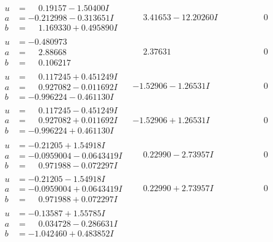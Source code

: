 \documentclass[1p]{elsarticle_modified}
\theoremstyle{definition}
\begin{document}
$$\begin{array}{c|c|c}
\begin{aligned}
u &= \phantom{-}0.19157 - 1.50400 I \\
a &= -0.212998 - 0.313651 I \\
b &= \phantom{-}1.169330 + 0.495890 I\end{aligned}
 & \phantom{-}3.41653 - 12.20260 I & \phantom{-0.000000 } 0 \\ \hline\begin{aligned}
u &= -0.480973\phantom{ +0.000000I} \\
a &= \phantom{-}2.88668\phantom{ +0.000000I} \\
b &= \phantom{-}0.106217\phantom{ +0.000000I}\end{aligned}
 & \phantom{-}2.37631\phantom{ +0.000000I} & \phantom{-0.000000 } 0 \\ \hline\begin{aligned}
u &= \phantom{-}0.117245 + 0.451249 I \\
a &= \phantom{-}0.927082 - 0.011692 I \\
b &= -0.996224 - 0.461130 I\end{aligned}
 & -1.52906 - 1.26531 I & \phantom{-0.000000 } 0 \\ \hline\begin{aligned}
u &= \phantom{-}0.117245 - 0.451249 I \\
a &= \phantom{-}0.927082 + 0.011692 I \\
b &= -0.996224 + 0.461130 I\end{aligned}
 & -1.52906 + 1.26531 I & \phantom{-0.000000 } 0 \\ \hline\begin{aligned}
u &= -0.21205 + 1.54918 I \\
a &= -0.0959004 - 0.0643419 I \\
b &= \phantom{-}0.971988 - 0.072297 I\end{aligned}
 & \phantom{-}0.22990 - 2.73957 I & \phantom{-0.000000 } 0 \\ \hline\begin{aligned}
u &= -0.21205 - 1.54918 I \\
a &= -0.0959004 + 0.0643419 I \\
b &= \phantom{-}0.971988 + 0.072297 I\end{aligned}
 & \phantom{-}0.22990 + 2.73957 I & \phantom{-0.000000 } 0 \\ \hline\begin{aligned}
u &= -0.13587 + 1.55785 I \\
a &= \phantom{-}0.034728 - 0.286631 I \\
b &= -1.042460 + 0.483852 I\end{aligned}

\end{array}$$
\end{document}
